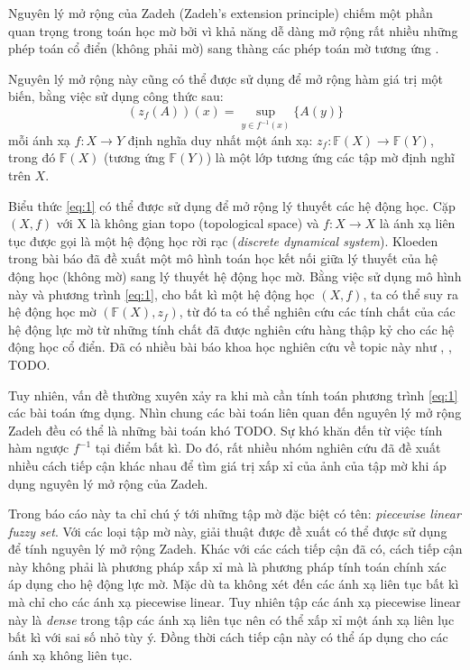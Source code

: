 \documentclass[../report.tex]{subfiles}
\begin{document}
Nguyên lý mở rộng của Zadeh (Zadeh's extension principle) chiếm một phần 
quan trọng trong toán học mờ bởi vì khả năng dễ dàng mở rộng rất nhiều những 
phép toán cổ điển (không phải mờ) sang thàng các phép toán mờ tương ứng \cite{Zadeh-extension}.

Nguyên lý mở rộng này cũng có thể được sử dụng để mở rộng hàm giá trị một biến,
bằng việc sử dụng công thức sau:
\begin{equation}
(z_f(A))(x) = \sup_{y \in f^{-1}(x)} \{ A(y) \}
\label{eq:1}
\end{equation}
mỗi ánh xạ $f: X \rightarrow Y$ định nghĩa duy nhất một ánh xạ:
$z_f: \mathbb{F}(X) \rightarrow \mathbb{F}(Y)$, trong đó $\mathbb{F}(X)$
(tương ứng $\mathbb{F}(Y)$) là một lớp tương ứng các tập mờ 
định nghĩ trên $X$.

Biểu thức \eqref{eq:1} có thể được sử dụng để mở rộng
lý thuyết các hệ động học. Cặp $(X, f)$ với X là không gian topo (topological space) 
và $f: X \rightarrow X$ là ánh xạ liên tục được gọi là một hệ động học rời rạc
(\textit{discrete dynamical system}).
Kloeden trong bài báo \cite{Kloeden} đã đề xuất một mô hình toán học 
kết nối giữa lý thuyết của hệ động học (không mờ) sang lý thuyết hệ động học mờ. 
Bằng việc sử dụng mô hình này và phương trình \eqref{eq:1}, cho bất kì một hệ động
học $(X, f)$, ta có thể suy ra hệ động học mờ $(\mathbb{F}(X), z_f)$, từ đó ta 
có thể nghiên cứu các tính chất của các hệ động lực mờ từ những tính chất đã được 
nghiên cứu hàng thập kỷ cho các hệ động học cổ điển. Đã có nhiều bài báo khoa học
nghiên cứu về topic này như \cite{topological-entropy}, \cite{diffusion-equation},
\cite{Kloeden} TODO.

Tuy nhiên, vấn đề thường xuyên xảy ra khi mà cần tính toán phương trình \eqref{eq:1}
các bài toán ứng dụng. Nhìn chung các bài toán liên quan đến nguyên lý mở rộng 
Zadeh đều có thể là những bài toán khó TODO. Sự khó khăn đến từ việc tính hàm ngược $f^{-1}$
tại điểm bất kì. Do đó, rất nhiều nhóm nghiên cứu đã đề xuất nhiều cách tiếp cận 
khác nhau để tìm giá trị xấp xỉ của ảnh của tập mờ khi áp dụng nguyên lý mở rộng của Zadeh.

Trong báo cáo này ta chỉ chú ý tới những tập mờ đặc biệt có tên:
\textit{piecewise linear fuzzy set}.
Với các loại tập mờ này, giải thuật được đề xuất có thể được sử dụng để tính 
nguyên lý mở rộng Zadeh. Khác với các cách tiếp cận đã có, cách tiếp cận này 
không phải là phương pháp xấp xỉ mà là phương pháp tính toán chính xác áp dụng 
cho hệ động lực mờ.  
Mặc dù ta không xét đến các ánh xạ liên tục bất kì mà chỉ cho các ánh xạ
piecewise linear. Tuy nhiên tập các ánh xạ piecewise linear này là
\textit{dense} trong tập các ánh xạ liên tục nên có thể xấp xỉ một 
ánh xạ liên lục bất kì với sai số nhỏ tùy ý.
Đồng thời cách tiếp cận này có thể áp dụng cho các ánh xạ không liên tục.
\end{document}
